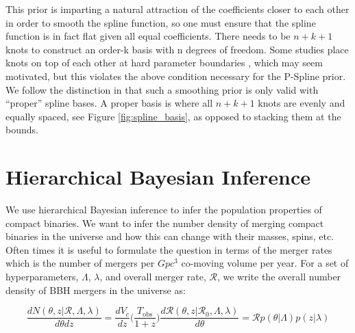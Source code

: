 
This prior is imparting a natural attraction of the coefficients closer to each other in order to smooth the spline function, so one 
must ensure that the spline function is in fact flat given all equal coefficients. There needs to be $n+k+1$ knots to construct an order-k 
basis with n degrees of freedom. Some studies place knots on top of each other at hard parameter boundaries \citep{deBoor78,monotone_regression_splines}, 
which may seem motivated, but this violates the above condition necessary for the P-Spline prior. We follow the distinction in \citet{eilers2021practical} 
that such a smoothing prior is only valid with ``proper'' spline bases. A proper basis is where all $n+k+1$ knots are evenly and equally spaced, 
see Figure \ref{fig:spline_basis}, as opposed to stacking them at the bounds.

\section{Hierarchical Bayesian Inference} \label{sec:hierarchical_inference}

We use hierarchical Bayesian inference to infer the population properties of compact binaries. We want to infer the number density of merging compact binaries  
in the universe and how this can change with their masses, spins, etc. Often times it is useful to formulate the question in terms of the 
merger rates which is the number of mergers per $Gpc^{3}$ co-moving volume per year. For a set of hyperparameters, $\Lambda$, $\lambda$, and overall 
merger rate, $\mathcal{R}$, we write the overall number density of BBH mergers in the universe as: 

\begin{equation} \label{number_density}
     \frac{dN(\theta, z | \mathcal{R}, \Lambda, \lambda)}{d\theta dz} = \frac{dV_c}{dz}\bigg(\frac{T_\mathrm{obs}}{1+z}\bigg) \frac{d\mathcal{R}(\theta, z | \mathcal{R}_0, \Lambda, \lambda)}{d\theta} = \mathcal{R} p(\theta | \Lambda) p(z | \lambda)
\end{equation}

